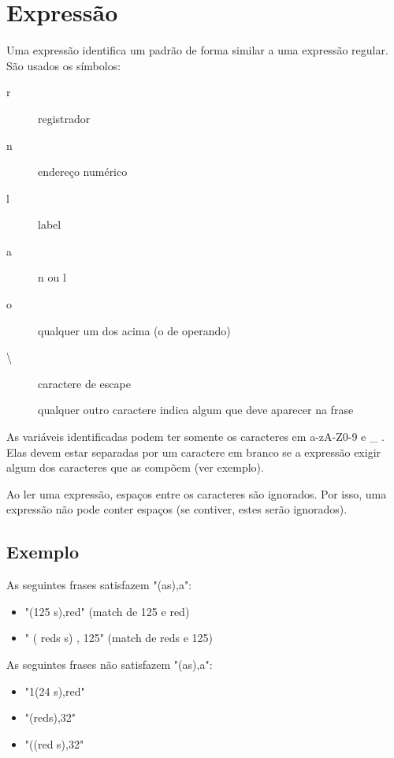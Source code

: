 \documentclass[a4paper,10pt]{article}
\begin{document}
\section{Expressão}
\label{expressão}
Uma expressão identifica um padrão de forma similar a uma expressão regular. São usados os símbolos: 

\begin{description}
	\item [r] registrador 
	\item [n] endereço numérico 
	\item [l] label 
	\item [a] n ou l 
	\item [o] qualquer um dos acima (o de operando) 
	\item [\textbackslash] caractere de escape 
	\item [] qualquer outro caractere indica algum que deve aparecer na frase
\end{description}

As variáveis identificadas podem ter somente os caracteres em a-zA-Z0-9 e \_ . Elas devem estar separadas por um caractere em branco se a expressão exigir algum dos caracteres que as compõem (ver exemplo). 

Ao ler uma expressão, espaços entre os caracteres são ignorados. Por isso, uma expressão não pode conter espaços (se contiver, estes serão ignorados).

	\subsection{Exemplo}
	As seguintes frases satisfazem "(as),a":
	\begin{itemize}
		\item "(125 s),red" (match de 125 e red) 
		\item " ( reds s) , 125" (match de reds e 125)
	\end{itemize}
	
	As seguintes frases não satisfazem "(as),a": 
	\begin{itemize}
		\item "1(24 s),red" 
		\item "(reds),32" 
		\item "((red s),32"
	\end{itemize}
\end{document}
